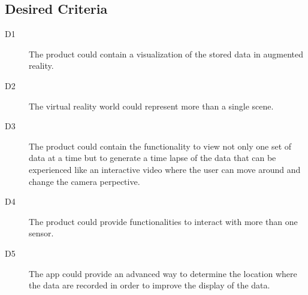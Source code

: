 \subsection{Desired Criteria}

\begin{description}
  \item[D1] The product could contain a visualization of the stored data in augmented reality.
  \item[D2] The virtual reality world could represent more than a single scene.
  \item[D3] The product could contain the functionality to view not only one set of data at a time but to generate a time lapse of the data that can be experienced like an interactive video where the user can move around and change the camera perpective.
  \item[D4] The product could provide functionalities to interact with more than one sensor.
  \item[D5] The app could provide an advanced way to determine the location where the data are recorded in order to improve the display of the data.
\end{description}
